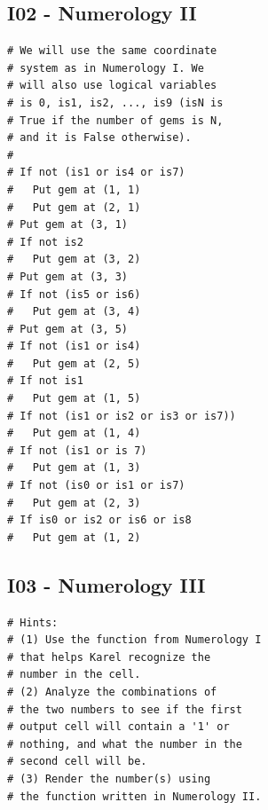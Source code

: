 \documentclass[article,A4,12pt]{llncs}
\begin{document}
\subsection{I02 - Numerology II}

\begin{verbatim}
# We will use the same coordinate
# system as in Numerology I. We 
# will also use logical variables 
# is 0, is1, is2, ..., is9 (isN is
# True if the number of gems is N,
# and it is False otherwise).
#
# If not (is1 or is4 or is7)
#   Put gem at (1, 1)
#   Put gem at (2, 1)
# Put gem at (3, 1)
# If not is2
#   Put gem at (3, 2)
# Put gem at (3, 3)
# If not (is5 or is6)
#   Put gem at (3, 4)
# Put gem at (3, 5)
# If not (is1 or is4)
#   Put gem at (2, 5)
# If not is1
#   Put gem at (1, 5)
# If not (is1 or is2 or is3 or is7))
#   Put gem at (1, 4)
# If not (is1 or is 7)
#   Put gem at (1, 3)
# If not (is0 or is1 or is7)
#   Put gem at (2, 3)
# If is0 or is2 or is6 or is8
#   Put gem at (1, 2)
\end{verbatim}

\subsection{I03 - Numerology III}

\begin{verbatim}
# Hints:
# (1) Use the function from Numerology I 
# that helps Karel recognize the
# number in the cell.
# (2) Analyze the combinations of
# the two numbers to see if the first 
# output cell will contain a '1' or
# nothing, and what the number in the 
# second cell will be. 
# (3) Render the number(s) using 
# the function written in Numerology II.
\end{verbatim}
\end{document}
